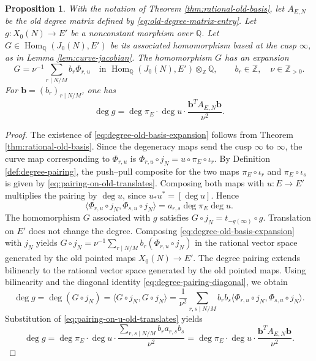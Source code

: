 \documentclass[12pt, letterpaper]{amsart}
\newtheorem{proposition}[theorem]{Proposition}
\theoremstyle{definition}
\theoremstyle{remark}
\newcommand{\Q}{\mathbb Q}
\newcommand{\Z}{\mathbb Z}
\newcommand{\Hom}{\operatorname{Hom}}
\numberwithin{equation}{section}
\begin{document}
\begin{proposition}\label{prop:degree}
With the notation of Theorem \ref{thm:rational-old-basis}, let
\(A_{E,N}\) be the old degree matrix defined by
\eqref{eq:old-degree-matrix-entry}. Let
\(g:X_0(N)\to E'\) be a nonconstant morphism over \(\Q\). Let
\(G\in\Hom_\Q(J_0(N),E')\) be its associated homomorphism based at the cusp
\(\infty\), as in Lemma \ref{lem:curve-jacobian}.
The homomorphism \(G\) has an expansion
\begin{equation}\label{eq:degree-old-basis-expansion}
        G=\nu^{-1}\sum_{r\mid N/M}b_r\Phi_{r,u}
        \quad\text{in }\Hom_\Q(J_0(N),E')\otimes_\Z\Q,
        \qquad b_r\in\Z,\quad \nu\in\Z_{>0}.
\end{equation}
For \(\boldsymbol{b}=(b_r)_{r\mid N/M}\), one has
\begin{equation}\label{eq:degree-formula-old}
 \deg g=\deg\pi_E\cdot\deg u\cdot
 \frac{\boldsymbol{b}^{T} A_{E,N}\boldsymbol{b}}{\nu^2}.
\end{equation}
\end{proposition}

\begin{proof}
The existence of \eqref{eq:degree-old-basis-expansion} follows from Theorem
\ref{thm:rational-old-basis}.
Since the degeneracy maps send the cusp \(\infty\) to \(\infty\), the curve map
corresponding to \(\Phi_{r,u}\) is
\(\Phi_{r,u}\circ j_N=u\circ\pi_E\circ\iota_r\).
By Definition \ref{def:degree-pairing}, the push--pull composite for the two maps
\(\pi_E\circ\iota_r\) and \(\pi_E\circ\iota_s\) is given by
\eqref{eq:pairing-on-old-translates}.
Composing both maps with \(u:E\to E'\) multiplies the pairing by \(\deg u\),
since \(u_*u^*=[\deg u]\). Hence
\begin{equation}\label{eq:pairing-on-u-old-translates}
        \langle \Phi_{r,u}\circ j_N,\Phi_{s,u}\circ j_N\rangle
        =a_{r,s}\deg\pi_E\deg u.
\end{equation}
The homomorphism \(G\) associated with \(g\) satisfies
\(G\circ j_N=t_{-g(\infty)}\circ g\). Translation on \(E'\) does not change
the degree. Composing \eqref{eq:degree-old-basis-expansion} with \(j_N\) yields
\(G\circ j_N=\nu^{-1}\sum_{r\mid N/M}b_r(\Phi_{r,u}\circ j_N)\) in the rational
vector space generated by the old pointed maps \(X_0(N)\to E'\). The degree
pairing extends bilinearly to the rational vector space generated by the old
pointed maps. Using bilinearity and the diagonal identity
\eqref{eq:degree-pairing-diagonal}, we obtain
\[
        \deg g
        =\deg(G\circ j_N)
        =\langle G\circ j_N,G\circ j_N\rangle
        =\frac1{\nu^2}\sum_{r,s\mid N/M}b_rb_s
          \langle \Phi_{r,u}\circ j_N,\Phi_{s,u}\circ j_N\rangle .
\]
Substitution of \eqref{eq:pairing-on-u-old-translates} yields
\[
        \deg g
        =\deg\pi_E\cdot\deg u\cdot
          \frac{\sum_{r,s\mid N/M}b_ra_{r,s}b_s}{\nu^2}
        =\deg\pi_E\cdot\deg u\cdot
          \frac{\boldsymbol{b}^{T} A_{E,N}\boldsymbol{b}}{\nu^2}.
\]
\end{proof}
\end{document}
